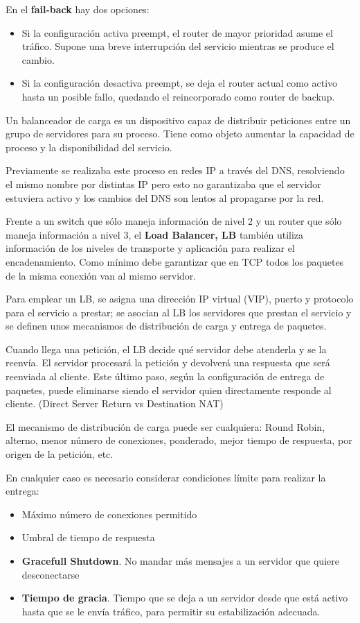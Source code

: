 En el \textbf{fail-back} hay dos opciones:
\begin{itemize}
\item Si la configuración activa preempt, el router de mayor prioridad asume el tráfico. Supone una breve interrupción del servicio mientras se produce el cambio.
\item Si la configuración desactiva preempt, se deja el router actual como activo hasta un posible fallo, quedando el reincorporado como router de backup.
\end{itemize}

\begin{defn}
Un balanceador de carga es un dispositivo capaz de distribuir peticiones entre un grupo de servidores para su proceso. Tiene como objeto aumentar la capacidad de proceso y la disponibilidad del servicio.

Previamente se realizaba este proceso en redes IP a través del DNS, resolviendo el mismo nombre por distintas IP pero esto no garantizaba que el servidor estuviera activo y los cambios del DNS son lentos al propagarse por la red.

Frente a un switch que sólo maneja información de nivel 2 y un router que sólo maneja información a nivel 3, el \textbf{Load Balancer, LB} también utiliza información de los niveles de transporte y aplicación para realizar el encadenamiento. Como mínimo debe garantizar que en TCP todos los paquetes de la misma conexión van al mismo servidor.
\end{defn}

Para emplear un LB, se asigna una dirección IP virtual (VIP), puerto y protocolo para el servicio a prestar; se asocian al LB los servidores que prestan el servicio y se definen unos mecanismos de distribución de carga y entrega de paquetes.

Cuando llega una petición, el LB decide qué servidor debe atenderla y se la reenvía. El servidor procesará la petición y devolverá una respuesta que será reenviada al cliente. Este último paso, según la configuración de entrega de paquetes, puede eliminarse siendo el servidor quien directamente responde al cliente. (Direct Server Return vs Destination NAT)

El mecanismo de distribución de carga puede ser cualquiera: Round Robin, alterno, menor número de conexiones, ponderado, mejor tiempo de respuesta, por origen de la petición, etc.

En cualquier caso es necesario considerar condiciones límite para realizar la entrega:
\begin{itemize}
\item Máximo número de conexiones permitido
\item Umbral de tiempo de respuesta
\item \textbf{Gracefull Shutdown}. No mandar más mensajes a un servidor que quiere desconectarse
\item \textbf{Tiempo de gracia}. Tiempo que se deja a un servidor desde que está activo hasta que se le envía tráfico, para permitir su estabilización adecuada.
\end{itemize}


